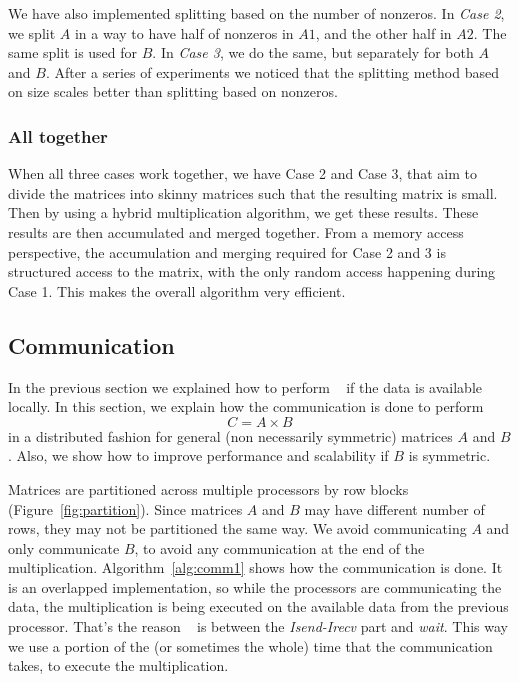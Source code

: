 We have also implemented splitting based on the number of nonzeros. In \textit{Case 2}, we split $A$ in a way to have half of nonzeros in $A1$, and the other half in $A2$. The same split is used for $B$. In \textit{Case 3}, we do the same, but separately for both $A$ and $B$. After a series of experiments we noticed that the splitting method based on size scales better than splitting based on nonzeros.

\subsubsection{All together}

When all three cases work together, we have Case 2 and Case 3, that aim to divide the matrices into skinny matrices such that the resulting matrix is small. Then by using a hybrid multiplication algorithm, we get these results. These results are then accumulated and merged together. From a memory access perspective, the accumulation and merging required for Case 2 and 3 is structured access to the matrix, with the only random access happening during Case 1. This makes the overall algorithm very efficient. 

\subsection{Communication}
\label{sec:amg}

In the previous section we explained how to perform \mm~ if the data is available locally. In this section, we explain how the communication is done to perform
\begin{equation}
    C = A \times B
\end{equation}
in a distributed fashion for general (non necessarily symmetric) matrices $A$ and $B$. Also, we show how to improve performance and scalability if $B$ is symmetric.

Matrices are partitioned across multiple processors by row blocks (Figure~\ref{fig:partition}). Since matrices $A$ and $B$ may have different number of rows, they may not be partitioned the same way. We avoid communicating $A$ and only communicate $B$, to avoid any communication at the end of the multiplication. Algorithm~\ref{alg:comm1} shows how the communication is done. It is an overlapped implementation, so while the processors are communicating the data, the multiplication is being executed on the available data from the previous processor. That's the reason \recmm~ is between the \textit{Isend-Irecv} part and \textit{wait}. This way we use a portion of the (or sometimes the whole) time that the communication takes, to execute the multiplication.

